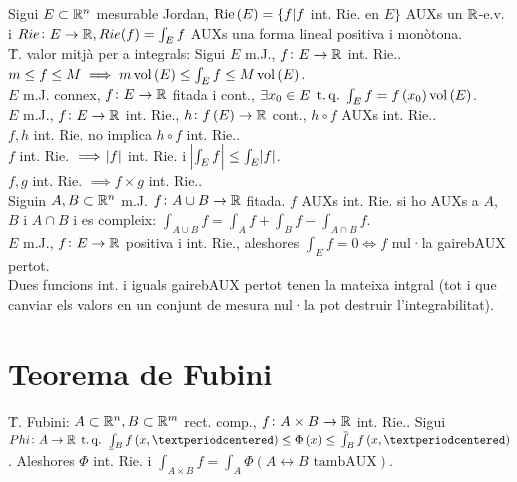 \ci Sigui $E\subset\mathbb{R}^n$ mesurable Jordan, $\operatorname{Rie}\left( E \right) = \{f | f$ int. Rie. en $E \}$ AUXs un $\mathbb{R}$-e.v. i $Rie\colon E \to \mathbb{R}, Rie(f) = \int_E f$ AUXs una forma lineal positiva i monòtona. \\
\u{T. valor mitjà per a integrals}: Sigui $E$ m.J., $f\colon E\to\mathbb{R}$ int. Rie.. $m\leq f\leq M \implies m\operatorname{vol}\left( E \right)\leq \int_E f\leq M\operatorname{vol}\left( E \right)$. \\
\ci $E$ m.J. connex, $f\colon E\to\mathbb{R}$ fitada i cont., $\exists x_0 \in E \operatorname{\;t.q.\;} \int_E f = f\left( x_0 \right)\operatorname{vol}\left( E \right)$. \\
\ci $E$ m.J., $f\colon E\to \mathbb{R}$ int. Rie., $h \colon f\left( E \right) \to \mathbb{R}$ cont., $h\circ f$ AUXs int. Rie.. \\
\ci $f, h$ int. Rie. no implica $h\circ f$ int. Rie.. \\
\ci $f$ int. Rie. $\implies \abs{f}$ int. Rie. i $\abs{\int_E f} \leq \int_E \abs{f}$. \\
\ci $f, g$ int. Rie. $\implies f\times g$ int. Rie.. \\
\ci Siguin $A,B\subset\mathbb{R}^n$ m.J. $f\colon A\cup B\to \mathbb{R}$ fitada. $f$ AUXs int. Rie. si ho AUXs a $A$, $B$ i $A\cap B$  i es compleix: $\int_{A\cup B} f= \int_A f + \int_B f - \int_{A\cap B} f$. \\
\ci $E$ m.J., $f\colon E \to \mathbb{R}$ positiva i int. Rie., aleshores $\int_E f=0 \iff f$ nul·la gairebAUX pertot. \\
\ci Dues funcions int. i iguals gairebAUX pertot tenen la mateixa intgral (tot i que canviar els valors en un conjunt de mesura nul·la pot destruir l'integrabilitat).

\section{Teorema de Fubini}

\u{T. Fubini}: $A\subset\mathbb{R}^n, B \subset \mathbb{R}^m$ rect. comp., $f\colon A\times B \to \mathbb{R}$ int. Rie.. Sigui $Phi\colon A\to\real \tq \lowint_B f\left( x,· \right) \leq \Phi\left( x \right) \leq \upint_B f\left( x, · \right)$. Aleshores $\Phi$ int. Rie. i $\int_{A\times B} f = \int_A \Phi \left( A \leftrightarrow B \text{ tambAUX}\right)$.
